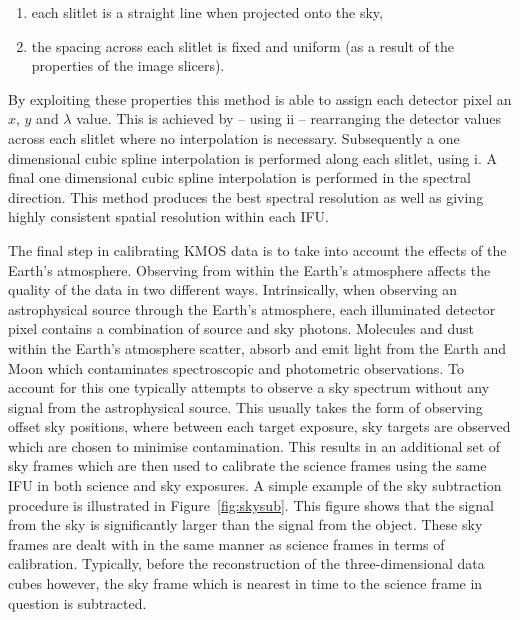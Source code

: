 \begin{enumerate}
    \item each slitlet is a straight line when projected onto the sky,
    \item the spacing across each slitlet is fixed and uniform (as a result of the properties of the image slicers).
\end{enumerate}

By exploiting these properties this method is able to assign each detector pixel an $x$, $y$ and $\lambda$ value.
This is achieved by -- using ii -- rearranging the detector values across each slitlet where no interpolation is necessary.\footnotemark
Subsequently a one dimensional cubic spline interpolation is performed along each slitlet, using i.
A final one dimensional cubic spline interpolation is performed in the spectral direction.
This method produces the best spectral resolution as well as giving highly consistent spatial resolution within each IFU.



The final step in calibrating KMOS data is to take into account the effects of the Earth's atmosphere.
Observing from within the Earth's atmosphere affects the quality of the data in two different ways.
Intrinsically, when observing an astrophysical source through the Earth's atmosphere, each illuminated detector pixel contains a combination of source and sky photons.
Molecules and dust within the Earth's atmosphere scatter, absorb and emit light from the Earth and Moon which contaminates spectroscopic and photometric observations.
To account for this one typically attempts to observe a sky spectrum without any signal from the astrophysical source.
This usually takes the form of observing offset sky positions, where between each target exposure, sky targets are observed which are chosen to minimise contamination.
This results in an additional set of sky frames which are then used to calibrate the science frames using the same IFU in both science and sky exposures.
A simple example of the sky subtraction procedure is illustrated in Figure~\ref{fig:skysub}.
This figure shows that the signal from the sky is significantly larger than the signal from the object.
These sky frames are dealt with in the same manner as science frames in terms of calibration.
Typically, before the reconstruction of the three-dimensional data cubes however, the sky frame which is nearest in time to the science frame in question is subtracted.

